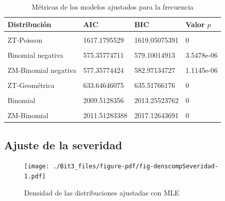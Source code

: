 \documentclass[
  letterpaper,
  onepage,
  openany]{scrreprt}
\begin{document}
\hypertarget{tbl-metricasFrecuencia}{}
\begin{table}
\caption{\label{tbl-metricasFrecuencia}Métricas de los modelos ajustados para la frecuencia }\tabularnewline

\centering
\begin{tabular}{l|l|l|l}
\hline
\textbf{Distribución} & \textbf{AIC} & \textbf{BIC} & \textbf{Valor $p$}\\
\hline
\cellcolor{gray!6}{Poisson} & \cellcolor{gray!6}{1617.17955289} & \cellcolor{gray!6}{1619.0507539} & \cellcolor{gray!6}{0}\\
\hline
ZT-Poisson & 1617.1795529 & 1619.05075391 & 0\\
\hline
\cellcolor{gray!6}{ZM-Poisson} & \cellcolor{gray!6}{1619.17955922} & \cellcolor{gray!6}{1622.92196124} & \cellcolor{gray!6}{0}\\
\hline
Binomial negativa & 575.35774711 & 579.10014913 & 3.5478e-06\\
\hline
\cellcolor{gray!6}{ZT-Binomial negativa} & \cellcolor{gray!6}{575.35774432} & \cellcolor{gray!6}{579.10014634} & \cellcolor{gray!6}{3.5344e-06}\\
\hline
ZM-Binomial negativa & 577.35774424 & 582.97134727 & 1.1145e-06\\
\hline
\cellcolor{gray!6}{Geométrica} & \cellcolor{gray!6}{634.00807001} & \cellcolor{gray!6}{635.87927102} & \cellcolor{gray!6}{0}\\
\hline
ZT-Geométrica & 633.64646075 & 635.51766176 & 0\\
\hline
\cellcolor{gray!6}{ZM-Geométrica} & \cellcolor{gray!6}{635.64646629} & \cellcolor{gray!6}{639.38886831} & \cellcolor{gray!6}{0}\\
\hline
Binomial & 2009.5128356 & 2013.25523762 & 0\\
\hline
\cellcolor{gray!6}{ZT-Binomial} & \cellcolor{gray!6}{2009.5128356} & \cellcolor{gray!6}{2013.25523762} & \cellcolor{gray!6}{0}\\
\hline
ZM-Binomial & 2011.51283388 & 2017.12643691 & 0\\
\hline
\end{tabular}
\end{table}

\hypertarget{ajuste-de-la-severidad}{%
\subsection{Ajuste de la severidad}\label{ajuste-de-la-severidad}}

\begin{figure}[H]

\caption{\label{fig-denscompSeveridad}Densidad de las distribuciones
ajustadas con MLE}

{\centering \texttt{[image: ./Bit3\_files/figure-pdf/fig-denscompSeveridad-1.pdf]}

}

\end{figure}
\end{document}
